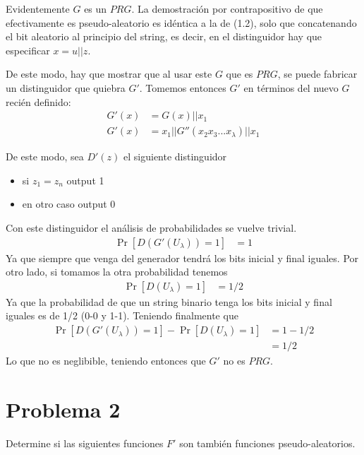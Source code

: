 \documentclass[twoside]{tareas}
\begin{document}
\begin{enumerate}
    Evidentemente $G$ es un $PRG$. La demostración por contrapositivo de que efectivamente es pseudo-aleatorio es idéntica a la de (1.2), solo que concatenando el bit aleatorio al principio del string, es decir, en el distinguidor hay que especificar $x = u||z$.

    De este modo, hay que mostrar que al usar este $G$ que es $PRG$, se puede fabricar un distinguidor que quiebra $G'$. Tomemos entonces $G'$ en términos del nuevo $G$ recién definido:
     \begin{align*}
        G'(x) &= G(x)||x_1\\
        G'(x) &= x_1 || G''(x_2 x_3...x_{\lambda}) || x_1
    \end{align*}

    De este modo, sea $D'(z)$ el siguiente distinguidor

    \begin{itemize}
        \item si $z_1 = z_{n}$ output 1
        \item en otro caso output 0
    \end{itemize}

    Con este distinguidor el análisis de probabilidades se vuelve trivial.
    \begin{align*}
        \Pr[D(G'(U_\lambda)) = 1] &= 1
    \end{align*}
    Ya que siempre que venga del generador tendrá los bits inicial y final iguales. Por otro lado, si tomamos la otra probabilidad tenemos
    \begin{align*}
        \Pr[D(U_\lambda) = 1] &= 1/2
    \end{align*}
    Ya que la probabilidad de que un string binario tenga los bits inicial y final iguales es de 1/2 (0-0 y 1-1). Teniendo finalmente que
    \begin{align*}
        \Pr[D(G'(U_\lambda)) = 1] - \Pr[D(U_\lambda) = 1] &= 1 - 1/2\\
        &= 1/2
    \end{align*}
    Lo que no es neglibible, teniendo entonces que $G'$ no es $PRG$.
\end{enumerate}

\section*{Problema 2}

Determine si las siguientes funciones $F'$ son también funciones pseudo-aleatorios.
\end{document}
